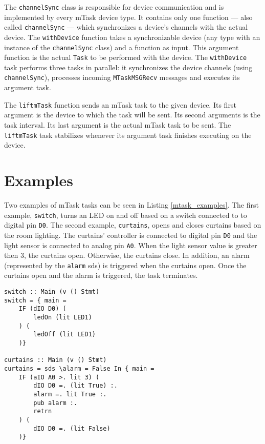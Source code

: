 The \texttt{channelSync} class is responsible for device communication and is implemented by every \gls{mTask} device type. It contains only one function --- also called \texttt{channelSync} --- 
which synchronizes a device's channels with the actual device. The \texttt{withDevice} function takes a synchronizable device (any type with an instance of the \texttt{channelSync} class) and a function as input. This argument function is the actual \texttt{Task} to be performed with the device. The \texttt{withDevice} task performs three tasks in parallel: it synchronizes the device channels (using \texttt{channelSync}), processes incoming \texttt{MTaskMSGRecv} messages and executes its argument task. 

The \texttt{liftmTask} function sends an \gls{mTask} task to the given device. Its first argument is the device to which the task will be sent. Its second arguments is the task interval. Its last argument is the actual \gls{mTask} task to be sent. The \texttt{liftmTask} task stabilizes whenever its argument task finishes executing on the device. 

\section{Examples}

Two examples of \gls{mTask} tasks can be seen in Listing \ref{mtask_examples}. The first example, \texttt{switch}, turns an LED on and off based on a switch connected to to digital pin \texttt{D0}. The second example, \texttt{curtains}, opens and closes curtains based on the room lighting. The curtains' controller is connected to digital pin \texttt{D0} and the light sensor is connected to analog pin \texttt{A0}. When the light sensor value is greater then 3, the curtains open. Otherwise, the curtains close. In addition, an alarm (represented by the \texttt{alarm} \ac{sds}) is triggered when the curtains open. Once the curtains open and the alarm is triggered, the task terminates.

\begin{lstlisting}[caption=Examples of mTask tasks,captionpos=b,label=mtask_examples]
switch :: Main (v () Stmt) 
switch = { main = 
	IF (dIO D0) (
		ledOn (lit LED1)
	) (
		ledOff (lit LED1)
	)}
	
curtains :: Main (v () Stmt)
curtains = sds \alarm = False In { main = 
	IF (aIO A0 >. lit 3) (
		dIO D0 =. (lit True) :.
		alarm =. lit True :.
		pub alarm :.
		retrn
	) (
		dIO D0 =. (lit False)
	)}
\end{lstlisting}





